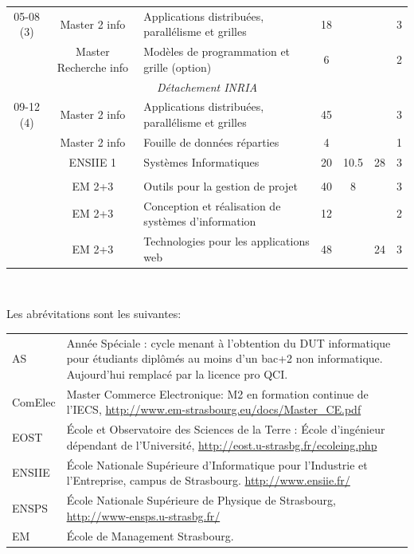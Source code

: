 \documentclass[11pt]{article}
\begin{document}
\begin{center}
{\begin{tabular}{|c|c|p{5cm}|c|c|c|c|}
\hline
05-08 (3)
	& Master 2 info		& Applications distribuées, parallélisme et grilles	&  18	& & & 3 \\
	& Master Recherche info	& Modèles de programmation et grille (option) 		& 6	& & & 2 \\
\hline

\multicolumn{7}{|c|}{\textit{Détachement INRIA}}\\  \hline
09-12 (4)
	& Master 2 info		& Applications distribuées, parallélisme et grilles	&  45	&   &   & 3 \\
	& Master 2 info		& Fouille de données réparties			&  4	&   &   & 1 \\
	& ENSIIE 1		& Systèmes Informatiques				& 20	& 10.5 & 28 & 3 \\ 
&&&&&&\\
	& EM 2+3		& Outils pour la gestion de projet			&  40	& 8 &   & 3 \\
	& EM 2+3		& Conception et réalisation de systèmes d'information	&  12	&   &   & 2 \\
	& EM 2+3		& Technologies pour les applications web		&  48	&   & 24& 3 \\
	
\hline
\end{tabular}\\
}

\end{center}

\noindent
Les abrévitations sont les suivantes:\\

\begin{small}
\begin{tabular}{lp{14cm}}
AS		& Année Spéciale : cycle menant à l'obtention du DUT informatique 
		pour étudiants diplômés au moins d'un bac+2 non informatique. Aujourd'hui remplacé par la licence pro QCI.\\ 
ComElec	& Master Commerce Electronique: M2 en formation continue de l'IECS, \url{http://www.em-strasbourg.eu/docs/Master_CE.pdf}\\
EOST 		& \'Ecole et Observatoire des Sciences de la Terre : \'Ecole d'ingénieur dépendant de l'Université, \url{http://eost.u-strasbg.fr/ecoleing.php}\\
ENSIIE	& \'Ecole Nationale Supérieure d'Informatique pour l'Industrie et l'Entreprise, campus de Strasbourg. \url{http://www.ensiie.fr/}\\
ENSPS		& \'Ecole Nationale Supérieure de Physique de Strasbourg, \url{http://www-ensps.u-strasbg.fr/}\\
EM		& \'Ecole de Management Strasbourg. \\
\end{tabular}
\end{small}
\end{document}
